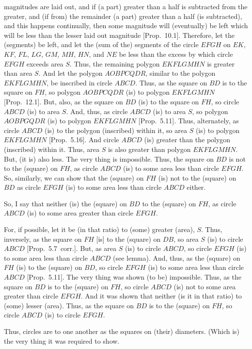 \begin{Parallel}{}{}
{magnitudes are laid out, and if (a part) greater than a half is subtracted
from the greater, and (if from) the remainder (a part) greater than a
half (is subtracted), and this happens continually, then some magnitude
will (eventually) be left which will be less than the lesser laid out magnitude [Prop.~10.1]. Therefore, let the (segments) be left, and let 
 the (sum of the) segments of the circle $EFGH$ on $EK$, $KF$, $FL$, $LG$, $GM$, $MH$, $HN$, and $NE$ be less than the excess by which  circle
 $EFGH$ exceeds  area $S$. Thus, the remaining polygon $EKFLGMHN$ is greater than area $S$. 
 And let the polygon $AOBPCQDR$,
 similar to the polygon $EKFLGMHN$, be inscribed in circle
 $ABCD$. Thus, as the square on $BD$ is to the square on $FH$, so
polygon $AOBPCQDR$ (is) to polygon $EKFLGMHN$ [Prop.~12.1]. But, also, as the square on $BD$ (is) to the square on $FH$, so circle $ABCD$ (is) to area $S$. And, thus, as
circle $ABCD$ (is) to area $S$, so polygon $AOBPGQDR$ (is) to
polygon $EKFLGMHN$ [Prop.~5.11]. Thus, alternately, as circle $ABCD$
(is) to the polygon (inscribed) within it, so area $S$ (is) to polygon $EKFLGMHN$
[Prop.~5.16]. And circle $ABCD$ (is)
greater than the polygon (inscribed) within it. Thus, area $S$ is also greater than polygon 
$EKFLGMHN$. But, (it is) also less. The very thing
is impossible. Thus, the square on $BD$ is not to the (square) on $FH$, as
circle $ABCD$ (is) to some area less than circle $EFGH$. So, similarly,
we can show that the (square) on $FH$ (is) not to the (square) on 
$BD$ as circle $EFGH$ (is) to some area less than circle $ABCD$ either.

So, I say that neither (is) the (square) on $BD$ to the (square) on $FH$,
as circle $ABCD$ (is) to some area greater than circle $EFGH$.

For, if possible, let it be (in that ratio) to (some)  greater (area), $S$. Thus, inversely, 
as the square on $FH$ [is] to the (square) on $DB$, so area $S$ (is) to circle $ABCD$ [Prop.~5.7~corr.]. But, as area $S$ (is) to circle $ABCD$, so circle $EFGH$
(is) to some area less than circle $ABCD$ (see lemma). And, thus, as the (square) on $FH$ (is) to the (square) on $BD$, so circle $EFGH$ (is) to some area
less than  circle $ABCD$ [Prop.~5.11]. The very thing was shown (to be) impossible.
Thus, as the square on $BD$ is to the (square) on $FH$, so circle $ABCD$
(is) not to some area greater than circle $EFGH$. And it was shown that neither (is it in that ratio) to (some) lesser (area). Thus, as the square on $BD$ is to the (square) on $FH$, so circle $ABCD$ (is) to circle $EFGH$.

Thus, circles are to one another as the squares on (their) diameters. (Which is) the very thing it was required to show.}
\end{Parallel}

